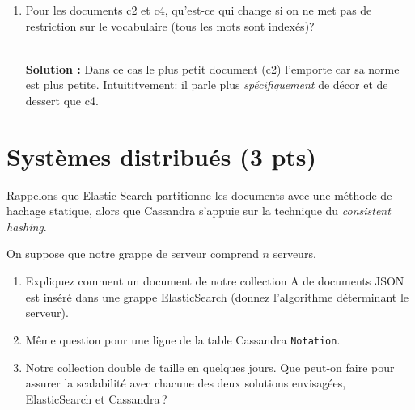 \documentclass[10pt,a4paper]{article}
\newenvironment{solution}[0]{
~\\ \color{red} \textbf{Solution : }\color{black}}{%
}
\begin{document}
\begin{enumerate}
\begin{solution}
\end{solution}  

   \item Pour les documents c2 et c4,
   qu'est-ce qui change si on ne met pas de restriction 
   sur le vocabulaire (tous les mots sont indexés)?
   
\begin{solution}
Dans ce cas le plus petit document (c2) l'emporte car sa norme est
plus petite. Intuititvement: il parle plus \emph{spécifiquement} de
décor et de dessert que c4.
\end{solution}   
\end{enumerate}


\section{Systèmes distribués (3 pts)}

Rappelons que Elastic Search partitionne les documents avec une méthode 
de hachage statique, alors que 
Cassandra s'appuie sur la technique
du \textit{consistent hashing}.

On suppose que notre grappe de serveur comprend $n$ serveurs. 

\begin{enumerate}
  \item Expliquez comment un document de notre collection A de documents 
     JSON est inséré dans une grappe ElasticSearch (donnez l'algorithme 
     déterminant le serveur). 
     \item Même question pour une ligne de la table Cassandra \texttt{Notation}.
     \item Notre collection double de taille en quelques jours. Que peut-on 
     faire pour assurer la scalabilité avec chacune des deux solutions envisagées, 
     ElasticSearch et Cassandra\,?
\end{enumerate}
\end{document}
